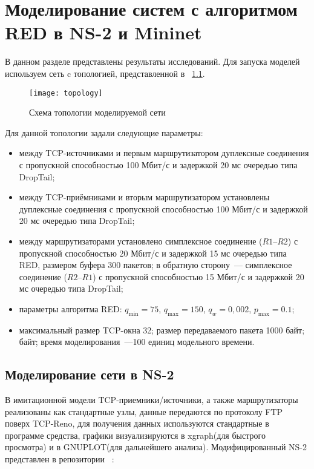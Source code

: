 
\chapter{Моделирование систем с алгоритмом RED в NS-2 и Mininet}
\label{chap3}

В данном разделе представлены результаты исследований. Для запуска моделей используем сеть c топологией, представленной в ~\ref{ch3:fig1}.
 
\begin{figure}[h!]
 \centerline{\texttt{[image: topology]}}
 \caption{Схема топологии моделируемой сети}
\label{ch3:fig1}
\end{figure}

Для данной топологии задали следующие параметры:

\begin{itemize}
\item между TCP-источниками и первым маршрутизатором дуплексные соединения 
	с пропускной способностью 100 Мбит/с и
  	задержкой 20 мс очередью типа DropTail;
\item между TCP-приёмниками и вторым маршрутизатором установлены
  	дуплексные соединения с пропускной способностью 100 Мбит/с и
  	задержкой 20 мс очередью типа DropTail;
\item между маршрутизаторами установлено симплексное соединение
  	($R1$--$R2$) с пропускной способностью 20 Мбит/с и задержкой 15 мс
  	очередью типа RED, размером буфера 300 пакетов; в обратную сторону~---
  	симплексное соединение ($R2$--$R1$) с пропускной способностью 15 Мбит/с и
  	задержкой 20 мс очередью типа DropTail;
\item параметры алгоритма RED: $q_{\min}=75$, $q_{\max}=150$, $q_w=0,002$, $p_{\max}=0.1$;
\item максимальный размер TCP-окна 32; размер передаваемого пакета 1000 байт;
  	байт; время моделирования~---100 единиц модельного времени.
\end{itemize}

\section{Моделирование сети в NS-2}
\label{chap3:sec1}

В имитационной модели TCP-приемники/источники, а также маршрутизаторы реализованы как стандартные узлы, данные передаются по протоколу FTP поверх TCP-Reno, 
для получения данных используются стандартные в программе средства, графики визуализируются в xgraph(для быстрого просмотра) и в GNUPLOT(для дальнейшего анализа).
Модифицированный NS-2 представлен в репозитории ~\cite{ns2-with-red}:


